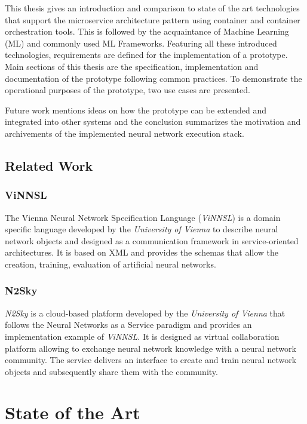 This thesis gives an introduction and comparison to state of the art
technologies that support the microservice architecture pattern using
container and container orchestration tools. This is followed by the
acquaintance of Machine Learning (ML) and commonly used ML Frameworks.
Featuring all these introduced technologies, requirements are defined
for the implementation of a prototype. Main sections of this thesis are
the specification, implementation and documentation of the prototype
following common practices. To demonstrate the operational purposes of
the prototype, two use cases are presented.

Future work mentions ideas on how the prototype can be extended and
integrated into other systems and the conclusion summarizes the
motivation and archivements of the implemented neural network execution
stack.

\section{Related Work}\label{related-work}

\subsection{ViNNSL}\label{vinnsl}

The Vienna Neural Network Specification Language (\emph{ViNNSL}) is a
domain specific language developed by the \emph{University of Vienna} to
describe neural network objects and designed as a communication
framework in service-oriented architectures. It is based on XML and
provides the schemas that allow the creation, training, evaluation of
artificial neural networks. \cite{beran_2008}

\subsection{N2Sky}\label{n2sky}

\emph{N2Sky} is a cloud-based platform developed by the \emph{University
of Vienna} that follows the Neural Networks as a Service paradigm and
provides an implementation example of \emph{ViNNSL}. It is designed as
virtual collaboration platform allowing to exchange neural network
knowledge with a neural network community. The service delivers an
interface to create and train neural network objects and subsequently
share them with the community. \cite{schikuta_2013}\cite{n2sky-2}

\chapter{State of the Art}\label{state-of-the-art}

